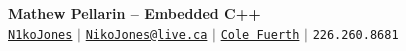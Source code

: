 \begin{center}
    \textbf{\Huge Mathew Pellarin -- Embedded C++} \\ \vspace{5pt}
    \hspace{1pt} \faGithub \hspace{2pt} \href{https://github.com/N1koJones}{\texttt{N1koJones}} \hspace{1pt} $|$
    \hspace{1pt} \faEnvelope \hspace{2pt} \href{mailto::nikojones@live.ca}{\texttt{NikoJones@live.ca}} \hspace{1pt} $|$
    \hspace{1pt} \faLinkedin \hspace{2pt} \href{https://www.linkedin.com/in/cole-fuerth-48344520a/}{\texttt{Cole Fuerth}} \hspace{1pt} $|$
    \small \faPhone* \texttt{226.260.8681}
    \\ \vspace{-3pt}
  \end{center}
